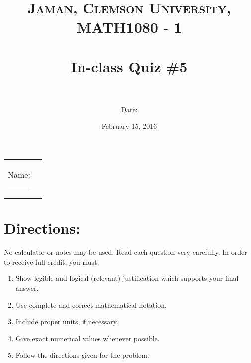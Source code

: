 \documentclass[paper=a4, fontsize=11pt]{scrartcl} %
\title{	
\normalfont \normalsize 
\textsc{Jaman, Clemson University, MATH1080 - 1} \\ [25pt] %
\horrule{0.5pt} \\[0.4cm] %
\huge In-class Quiz \#5 \\ %
\horrule{2pt} \\[0.5cm] %
}
\author{Date:} %
\date{\normalsize February 15, 2016} %
\numberwithin{equation}{section} %
\numberwithin{figure}{section} %
\numberwithin{table}{section} %
\begin{document}
\maketitle %

\begin{flushleft}
\begin{tabular}{l l}
Name: \rule{3.2in}{.01cm}  & {}%
\end{tabular}
\end{flushleft}


\section*{\textbf{Directions:}}

No calculator or notes may be used.  Read each question very carefully.  In order to receive full credit, you must:
\begin{enumerate}
\item Show legible and logical (relevant) justification which supports your final answer.
\item Use complete and correct mathematical notation.
\item Include proper units, if necessary.
\item Give exact numerical values whenever possible.
\item Follow the directions given for the problem.
\end{enumerate}
\vspace{.1in}

\newpage
\end{document}
